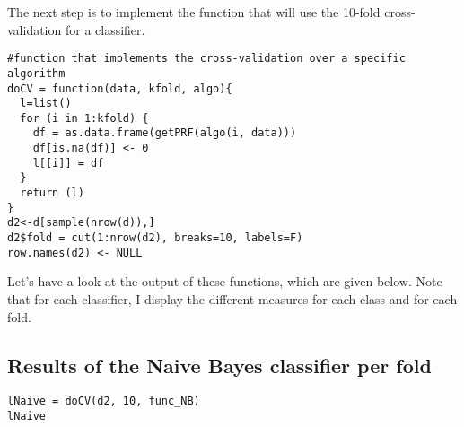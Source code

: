 \documentclass[]{article}
\begin{document}
The next step is to implement the function that will use the 10-fold
cross-validation for a classifier.

\begin{lstlisting}[frame=single]
#function that implements the cross-validation over a specific algorithm
doCV = function(data, kfold, algo){
  l=list()
  for (i in 1:kfold) {
    df = as.data.frame(getPRF(algo(i, data)))
    df[is.na(df)] <- 0
    l[[i]] = df
  }
  return (l)
}
d2<-d[sample(nrow(d)),]
d2$fold = cut(1:nrow(d2), breaks=10, labels=F)
row.names(d2) <- NULL
\end{lstlisting}

Let's have a look at the output of these functions, which are given
below. Note that for each classifier, I display the different measures
for each class and for each fold.

\subsection{Results of the Naive Bayes classifier per fold}

\begin{lstlisting}[frame=single]
lNaive = doCV(d2, 10, func_NB)
lNaive
\end{lstlisting}
\end{document}
